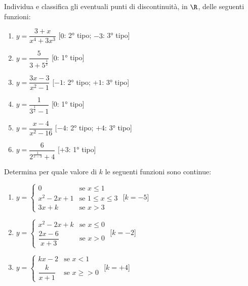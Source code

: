\begin{esercizio}\label{ese:03.1}
Individua e classifica gli eventuali punti di discontinuità, in \(\R\), 
delle seguenti funzioni:
\begin{multicols}{2}
 \begin{enumerate} [label=\alph*]
  \item \(y = \dfrac{3 + x}{x^4 + 3 x^3}\)
   \hfill[\(0\): 2° tipo; \(-3\): 3° tipo]
  \item \(y = \dfrac{5}{3 + 5^{\frac{1}{x}}}\)
   \hfill[\(0\): 1° tipo]
  \item \(y = \dfrac{3 x - 3}{x^2 - 1}\)
   \hfill[\(-1\): 2° tipo; \(+1\): 3° tipo]
  \item \(y = \dfrac{1}{3^{\frac{1}{x}}-1}\)
   \hfill[\(0\): 1° tipo]
  \item \(y = \dfrac{x - 4}{x^2 - 16}\)
   \hfill[\(-4\): 2° tipo; \(+4\): 3° tipo]
  \item \(y = \dfrac{6}{2^{\frac{1}{x-3}} + 4}\)
   \hfill[\(+3\): 1° tipo]
 \end{enumerate}
\end{multicols}
\end{esercizio}

\begin{esercizio}\label{ese:03.1}
Determina per quale valore di \(k\) le seguenti funzioni sono continue:
 \begin{enumerate} [label=\alph*]
  \item 
  \(y=\begin{cases} 
    0 & \mbox{se } x \leqslant 1 \\ 
    x^2-2x+1 & \mbox{se } 1 \leqslant x \leqslant 3 \\ 
    3x+k & \mbox{se } x > 3
  \end{cases}\)
  \hfill [\(k=-5\)]
  \item 
  \(y=\begin{cases} 
    x^2-2x+k & \mbox{se } x \leqslant 0 \\ 
    \dfrac{2x-6}{x+3} & \mbox{se } x > 0
  \end{cases}\)
  \hfill [\(k=-2\)]
  \item 
  \(y=\begin{cases} 
    kx-2 & \mbox{se } x < 1 \\ 
    \dfrac{k}{x+1} & \mbox{se } x \geqslant> 0
  \end{cases}\)
  \hfill [\(k=+4\)]
 \end{enumerate}
\end{esercizio}

